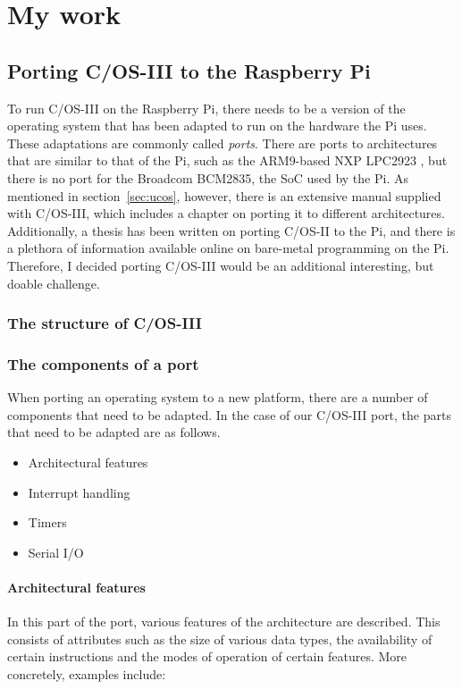 \documentclass[twoside]{uva-inf-bachelor-thesis}
\newcommand{\ucosiii}{\textmu C/OS-III\xspace}
\newcommand{\ucosii}{\textmu C/OS-II\xspace}
\begin{document}
\chapter{My work}
\section{Porting \ucosiii to the Raspberry Pi}
To run \ucosiii on the Raspberry Pi, there needs to be a version of the operating system that has been adapted to run on the hardware the Pi uses. These adaptations are commonly called \textit{ports}. There are ports to architectures that are similar to that of the Pi, such as the ARM9-based NXP LPC2923 \cite{micrium:nxplpc}, but there is no port for the Broadcom BCM2835, the SoC used by the Pi. As mentioned in section~\ref{sec:ucos}, however, there is an extensive manual supplied with \ucosiii, which includes a chapter on porting it to different architectures. Additionally, a thesis has been written on porting \ucosii to the Pi\cite{sfd:realpi}, and there is a plethora of information available online on bare-metal programming on the Pi. Therefore, I decided porting \ucosiii would be an additional interesting, but doable challenge.

\subsection{The structure of \ucosiii}

\subsection{The components of a port}
When porting an operating system to a new platform, there are a number of components that need to be adapted. In the case of our \ucosiii port, the parts that need to be adapted are as follows.

\begin{itemize}
    \item Architectural features
    \item Interrupt handling
    \item Timers
    \item Serial I/O
\end{itemize}



\subsubsection{Architectural features}
In this part of the port, various features of the architecture are described. This consists of attributes such as the size of various data types, the availability of certain instructions and the modes of operation of certain features. More concretely, examples include:
\end{document}
